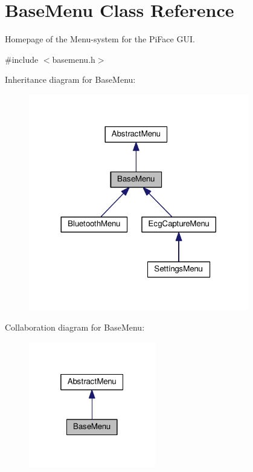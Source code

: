 \hypertarget{classBaseMenu}{}\section{Base\+Menu Class Reference}
\label{classBaseMenu}


Homepage of the Menu-\/system for the Pi\+Face G\+UI.  




{\ttfamily \#include $<$basemenu.\+h$>$}



Inheritance diagram for Base\+Menu\+:
\nopagebreak
\begin{figure}[H]
\begin{center}
\leavevmode
\includegraphics[width=272pt]{classBaseMenu__inherit__graph}
\end{center}
\end{figure}


Collaboration diagram for Base\+Menu\+:
\nopagebreak
\begin{figure}[H]
\begin{center}
\leavevmode
\includegraphics[width=157pt]{classBaseMenu__coll__graph}
\end{center}
\end{figure}
